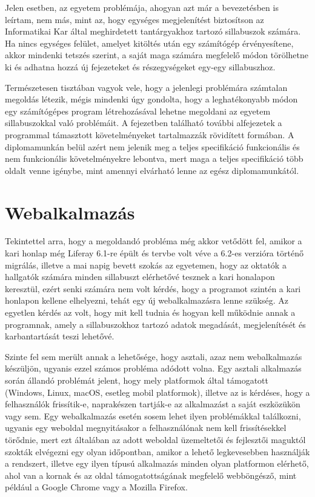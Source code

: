 \documentclass[hidelinks, 12pt, a4paper]{report}
\begin{document}
Jelen esetben, az egyetem problémája, ahogyan azt már a bevezetésben is leírtam, nem más, mint az, hogy egységes megjelenítést biztosítson az Informatikai Kar által meghirdetett tantárgyakhoz tartozó sillabuszok számára. Ha nincs egységes felület, amelyet kitöltés után egy számítógép érvényesítene, akkor mindenki tetszés szerint, a saját maga számára megfelelő módon törölhetne ki és adhatna hozzá új fejezeteket és részegységeket egy-egy sillabuszhoz.

Természetesen tisztában vagyok vele, hogy a jelenlegi problémára számtalan megoldás létezik, mégis mindenki úgy gondolta, hogy a leghatékonyabb módon egy számítógépes program létrehozásával lehetne megoldani az egyetem sillabuszokkal való problémáit. A fejezetben található további alfejezetek a programmal támasztott követelményeket tartalmazzák rövidített formában. A diplomamunkán belül azért nem jelenik meg a teljes specifikáció funkcionális és nem funkcionális követelményekre lebontva, mert maga a teljes specifikáció több oldalt venne igénybe, mint amennyi elvárható lenne az egész diplomamunkától.

\section{Webalkalmazás}

Tekintettel arra, hogy a megoldandó probléma még akkor vetődött fel, amikor a  kari honlap még Liferay 6.1-re épült és tervbe volt véve a 6.2-es verzióra történő migrálás, illetve a mai napig bevett szokás az egyetemen, hogy az oktatók a hallgatók számára minden sillabuszt elérhetővé tesznek a kari honalapon keresztül, ezért senki számára nem volt kérdés, hogy a programot szintén a kari honlapon kellene elhelyezni, tehát egy új webalkalmazásra lenne szükség. Az egyetlen kérdés az volt, hogy mit kell tudnia és hogyan kell működnie annak a programnak, amely a sillabuszokhoz tartozó adatok megadását, megjelenítését és karbantartását teszi lehetővé.

Szinte fel sem merült annak a lehetősége, hogy asztali, azaz nem webalkalmazás készüljön, ugyanis ezzel számos probléma adódott volna. Egy asztali alkalmazás során állandó problémát jelent, hogy mely platformok által támogatott (Windows, Linux, macOS, esetleg mobil platformok), illetve az is kérdéses, hogy a felhasználók frissítik-e, naprakészen tartják-e az alkalmazást a saját eszközükön vagy sem. Egy webalkalmazás esetén sosem lehet ilyen problémákkal találkozni, ugyanis egy weboldal megnyitásakor a felhasználónak nem kell frissítésekkel törődnie, mert ezt általában az adott weboldal üzemeltetői és fejlesztői maguktól szokták elvégezni egy olyan időpontban, amikor a lehető legkevesebben használják a rendszert, illetve egy ilyen típusú alkalmazás minden olyan platformon elérhető, ahol van a kornak és az oldal támogatottságának megfelelő webböngésző, mint például a Google Chrome vagy a Mozilla Firefox. 
\end{document}
